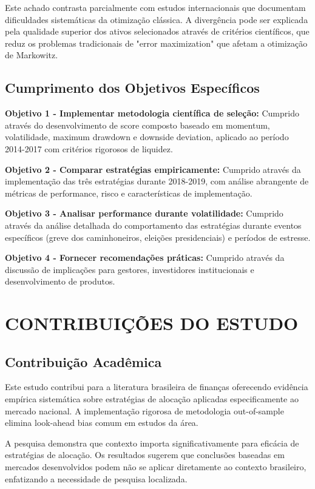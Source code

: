 Este achado contrasta parcialmente com estudos internacionais que documentam dificuldades sistemáticas da otimização clássica. A divergência pode ser explicada pela qualidade superior dos ativos selecionados através de critérios científicos, que reduz os problemas tradicionais de "error maximization" que afetam a otimização de Markowitz.

\subsection{Cumprimento dos Objetivos Específicos}

\textbf{Objetivo 1 - Implementar metodologia científica de seleção:} Cumprido através do desenvolvimento de score composto baseado em momentum, volatilidade, maximum drawdown e downside deviation, aplicado ao período 2014-2017 com critérios rigorosos de liquidez.

\textbf{Objetivo 2 - Comparar estratégias empiricamente:} Cumprido através da implementação das três estratégias durante 2018-2019, com análise abrangente de métricas de performance, risco e características de implementação.

\textbf{Objetivo 3 - Analisar performance durante volatilidade:} Cumprido através da análise detalhada do comportamento das estratégias durante eventos específicos (greve dos caminhoneiros, eleições presidenciais) e períodos de estresse.

\textbf{Objetivo 4 - Fornecer recomendações práticas:} Cumprido através da discussão de implicações para gestores, investidores institucionais e desenvolvimento de produtos.

\section{CONTRIBUIÇÕES DO ESTUDO}

\subsection{Contribuição Acadêmica}

Este estudo contribui para a literatura brasileira de finanças oferecendo evidência empírica sistemática sobre estratégias de alocação aplicadas especificamente ao mercado nacional. A implementação rigorosa de metodologia out-of-sample elimina look-ahead bias comum em estudos da área.

A pesquisa demonstra que contexto importa significativamente para eficácia de estratégias de alocação. Os resultados sugerem que conclusões baseadas em mercados desenvolvidos podem não se aplicar diretamente ao contexto brasileiro, enfatizando a necessidade de pesquisa localizada.

